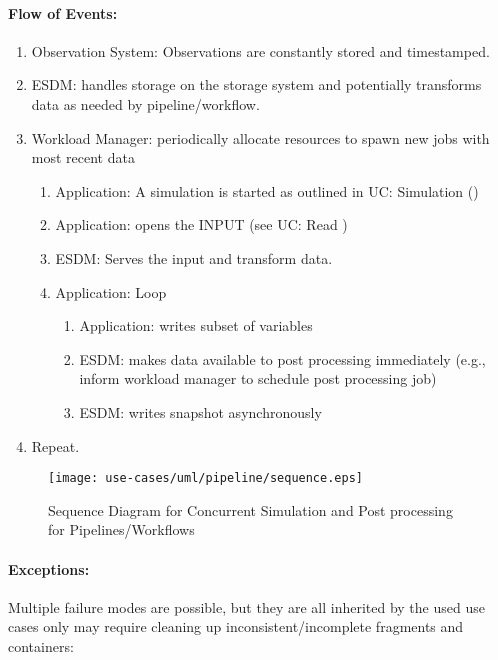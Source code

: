 \paragraph{Flow of Events:}
\begin{enumerate}
	\item Observation System: Observations are constantly stored and timestamped.
	\item ESDM: handles storage on the storage system and potentially transforms data as needed by pipeline/workflow.
	\item Workload Manager: periodically allocate resources to spawn new jobs with most recent data
	\begin{enumerate}
		\item Application: A simulation is started as outlined in UC: Simulation ()
		\item Application: opens the INPUT (see UC: Read )
		\item ESDM: Serves the input and transform data.
		\item Application: Loop
			\begin{enumerate}
				\item Application: writes subset of variables
				\item ESDM: makes data available to post processing immediately (e.g., inform workload manager to schedule post processing job)
				\item ESDM: writes snapshot asynchronously
			\end{enumerate}
	\end{enumerate}
	\item Repeat.
\end{enumerate}

\begin{figure}
	\centering
	\texttt{[image: use-cases/uml/pipeline/sequence.eps]}
	\caption{Sequence Diagram for Concurrent Simulation and Post processing for Pipelines/Workflows}
	\label{fig:sequence pipeline}
\end{figure}




\paragraph{Exceptions:}
Multiple failure modes are possible, but they are all inherited by the used use cases only may require cleaning up inconsistent/incomplete fragments and containers:

